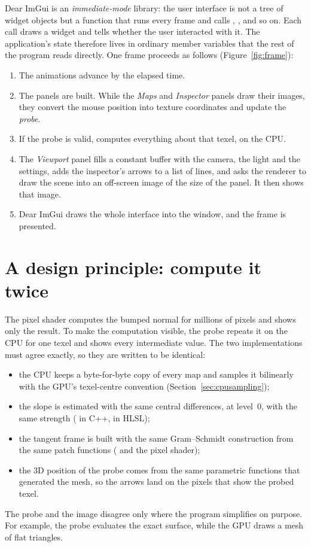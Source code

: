 Dear ImGui is an \emph{immediate-mode} library: the user interface is not a tree of widget
objects but a function that runs every frame and calls ,
, and so on. Each call draws a widget and tells whether the user
interacted with it. The application's state therefore lives in ordinary member variables that
the rest of the program reads directly. One frame proceeds as follows
(Figure~\ref{fig:frame}):
\begin{enumerate}
\item The animations advance by the elapsed time.
\item The panels are built. While the \emph{Maps} and \emph{Inspector} panels draw their images,
they convert the mouse position into texture coordinates and update the \emph{probe}.
\item If the probe is valid,  computes everything about that texel, on the CPU.
\item The \emph{Viewport} panel fills a constant buffer with the camera, the light and the
settings, adds the inspector's arrows to a list of lines, and asks the renderer to draw the scene
into an off-screen image of the size of the panel. It then shows that image.
\item Dear ImGui draws the whole interface into the window, and the frame is presented.
\end{enumerate}

\section{A design principle: compute it twice}
The pixel shader computes the bumped normal for millions of pixels and shows only the result.
To make the computation visible, the probe repeats it on the CPU for one texel and shows every
intermediate value. The two implementations must agree exactly, so they are written to be
identical:
\begin{itemize}
\item the CPU keeps a byte-for-byte copy of every map and samples it bilinearly with the GPU's
texel-centre convention (Section~\ref{sec:cpusampling});
\item the slope is estimated with the same central differences, at level~0, with the same
strength ( in C++,  in HLSL);
\item the tangent frame is built with the same Gram--Schmidt construction from the same patch
functions ( and the pixel shader);
\item the 3D position of the probe comes from the same parametric functions that generated the
mesh, so the arrows land on the pixels that show the probed texel.
\end{itemize}
The probe and the image disagree only where the program simplifies on purpose. For example, the
probe evaluates the exact surface, while the GPU draws a mesh of flat triangles.
